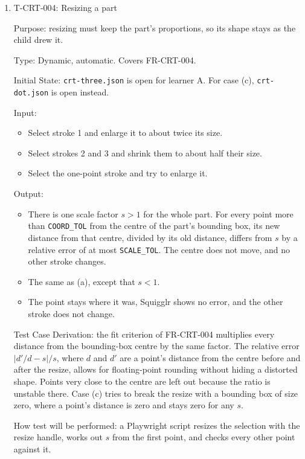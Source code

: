 \documentclass[12pt, titlepage]{article}
\newcommand{\testitem}[1]{\item #1\par\nopagebreak}
\begin{document}
\begin{enumerate}
How test will be performed: a Playwright script drags the selection and
computes each point's offset from the fixture.

\testitem{T-CRT-004: Resizing a part}

Purpose: resizing must keep the part's proportions, so its shape stays as the
child drew it.

Type: Dynamic, automatic. Covers FR-CRT-004.

Initial State: \texttt{crt-three.json} is open for learner A. For case (c),
\texttt{crt-dot.json} is open instead.

Input:
\begin{itemize}
\item[(a)] Select stroke 1 and enlarge it to about twice its size.
\item[(b)] Select strokes 2 and 3 and shrink them to about half their size.
\item[(c)] Select the one-point stroke and try to enlarge it.
\end{itemize}

Output:
\begin{itemize}
\item[(a)] There is one scale factor $s > 1$ for the whole part. For every
point more than \texttt{COORD\_TOL} from the centre of the part's bounding
box, its new distance from that centre, divided by its old distance, differs
from $s$ by a relative error of at most \texttt{SCALE\_TOL}. The centre does
not move, and no other stroke changes.
\item[(b)] The same as (a), except that $s < 1$.
\item[(c)] The point stays where it was, Squigglr shows no error, and the
other stroke does not change.
\end{itemize}

Test Case Derivation: the fit criterion of FR-CRT-004 multiplies every
distance from the bounding-box centre by the same factor. The relative error
$|d'/d - s|/s$, where $d$ and $d'$ are a point's distance from the centre
before and after the resize, allows for floating-point rounding without
hiding a distorted shape. Points very close to the centre are left out
because the ratio is unstable there. Case (c) tries to break the resize with
a bounding box of size zero, where a point's distance is zero and stays zero
for any $s$.

How test will be performed: a Playwright script resizes the selection with
the resize handle, works out $s$ from the first point, and checks every other
point against it.


\end{enumerate}
\end{document}
